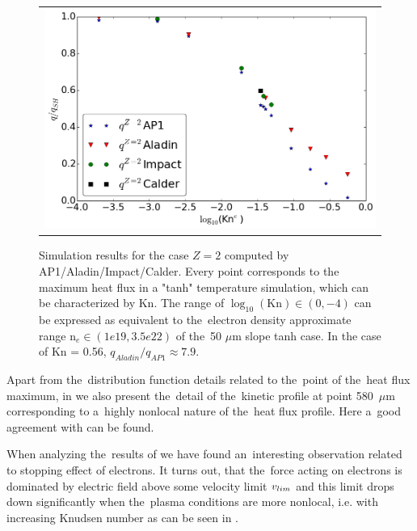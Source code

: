 \begin{figure}[tbh]
  \begin{center}
    \begin{tabular}{c}
      \includegraphics[width=\figscale\textwidth]{Kn_results.png}
    \end{tabular}
  \caption{  
  Simulation results for the case $Z=2$ computed by AP1/Aladin/Impact/Calder.
  Every point corresponds to the maximum heat flux in a "tanh" temperature 
  simulation, which can be characterized by Kn. The range of 
  $\log_{10}(\text{Kn})\in (0, -4)$ can be expressed as equivalent 
  to the~electron density approximate range n$_e \in (1e19, 3.5e22)$ of 
  the~50 $\mu$m slope tanh case. In the case of Kn = 0.56, 
  $q_{Aladin} / q_{AP1}\approx 7.9$.}
  \label{fig:Kn_results}
  \end{center} 
\end{figure}

Apart from the~distribution function details related to the~point of 
the~heat flux maximum, in 
we also present the~detail of the~kinetic profile at point 580~$\mu$m 
corresponding to a~highly nonlocal nature of the~heat flux profile. 
Here a~good agreement with \cite{Sherlock_PoP2017} can be found.

When analyzing the~results of  we have found 
an~interesting observation related to stopping effect of electrons.
It turns out, that the~force acting on electrons is dominated by electric field
above some velocity limit $v_{lim}$ and this limit drops down significantly
when the~plasma conditions are more nonlocal, i.e. with increasing Knudsen 
number as can be seen in .

